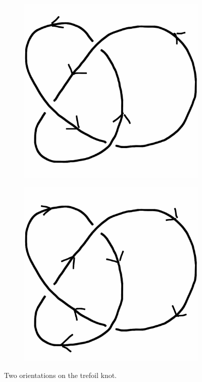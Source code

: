 \documentclass[12pt,letterpaper]{article}
\theoremstyle{definition}
\begin{document}
\begin{figure}[h]
    \centering
    \begin{subfigure}{.3\textwidth}
        \centering
        \includegraphics[width=\textwidth]{knotpics/trefoil-forward.png}
    \end{subfigure}
    \hspace{1cm}
    \begin{subfigure}{.3\textwidth}
        \centering         
        \includegraphics[width=\textwidth]{knotpics/trefoil-reverse.png}
    \end{subfigure}
    \caption{Two orientations on the trefoil knot.}
\end{figure}
\end{document}
